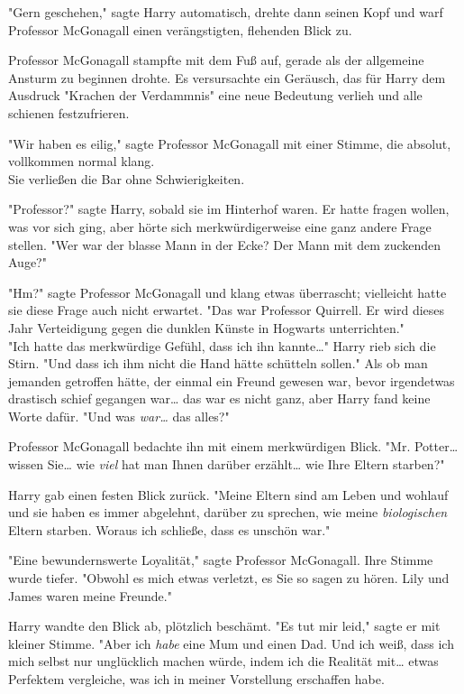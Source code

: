 {"Gern geschehen," sagte Harry automatisch, drehte dann seinen Kopf und warf Professor McGonagall einen verängstigten, flehenden Blick zu.

Professor McGonagall stampfte mit dem Fuß auf, gerade als der allgemeine Ansturm zu beginnen drohte. Es versursachte ein Geräusch, das für Harry dem Ausdruck "Krachen der Verdammnis" eine neue Bedeutung verlieh und alle schienen festzufrieren.

"Wir haben es eilig," sagte Professor McGonagall mit einer Stimme, die absolut, vollkommen normal klang.\\ Sie verließen die Bar ohne Schwierigkeiten.

"Professor?" sagte Harry, sobald sie im Hinterhof waren. Er hatte fragen wollen, was vor sich ging, aber hörte sich merkwürdigerweise eine ganz andere Frage stellen. "Wer war der blasse Mann in der Ecke? Der Mann mit dem zuckenden Auge?"

"Hm?" sagte Professor McGonagall und klang etwas überrascht; vielleicht hatte sie diese Frage auch nicht erwartet. "Das war Professor Quirrell. Er wird dieses Jahr Verteidigung gegen die dunklen Künste in Hogwarts unterrichten."\\ "Ich hatte das merkwürdige Gefühl, dass ich ihn kannte…" Harry rieb sich die Stirn. "Und dass ich ihm nicht die Hand hätte schütteln sollen." Als ob man jemanden getroffen hätte, der einmal ein Freund gewesen war, bevor irgendetwas drastisch schief gegangen war… das war es nicht ganz, aber Harry fand keine Worte dafür. "Und was \emph{war…} das alles?"

Professor McGonagall bedachte ihn mit einem merkwürdigen Blick. "Mr. Potter… wissen Sie… wie \emph{viel} hat man Ihnen darüber erzählt… wie Ihre Eltern starben?"

Harry gab einen festen Blick zurück. "Meine Eltern sind am Leben und wohlauf und sie haben es immer abgelehnt, darüber zu sprechen, wie meine \emph{biologischen} Eltern starben. Woraus ich schließe, dass es unschön war."

"Eine bewundernswerte Loyalität," sagte Professor McGonagall. Ihre Stimme wurde tiefer. "Obwohl es mich etwas verletzt, es Sie so sagen zu hören. Lily und James waren meine Freunde."

Harry wandte den Blick ab, plötzlich beschämt. "Es tut mir leid," sagte er mit kleiner Stimme. "Aber ich \emph{habe} eine Mum und einen Dad. Und ich weiß, dass ich mich selbst nur unglücklich machen würde, indem ich die Realität mit… etwas Perfektem vergleiche, was ich in meiner Vorstellung erschaffen habe.

}
